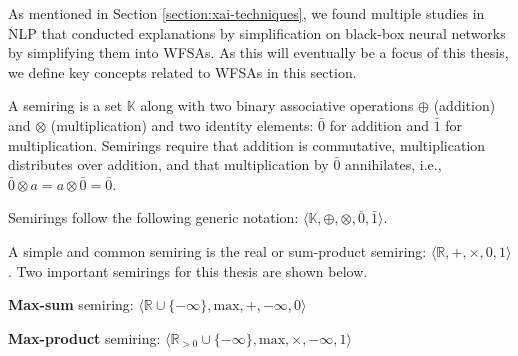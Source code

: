 \label{section:wfsa}

As mentioned in Section \ref{section:xai-techniques}, we found multiple studies in NLP that conducted explanations by simplification on black-box neural networks by simplifying them into WFSAs. As this will eventually be a focus of this thesis, we define key concepts related to WFSAs in this section.

\begin{definition}
  A semiring is a set $\mathbb{K}$ along with two binary associative operations $\oplus$ (addition) and $\otimes$ (multiplication) and two identity elements: $\bar{0}$ for addition and $\bar{1}$ for multiplication. Semirings require that addition is commutative, multiplication distributes over addition, and that multiplication by $\bar{0}$ annihilates, i.e., $\bar{0} \otimes a = a \otimes \bar{0} = \bar{0}$.

\begin{remark}
  Semirings follow the following generic notation: $\langle \mathbb{K}, \oplus, \otimes, \bar{0}, \bar{1} \rangle$.
\end{remark}

\begin{remark}
  A simple and common semiring is the real or sum-product semiring: $\langle \mathbb{R}, +, \times, 0, 1 \rangle$. Two important semirings for this thesis are shown below.
\end{remark}

\begin{remark}
  \textbf{Max-sum} semiring: $\langle \mathbb{R} \cup \{-\infty\}, \text{max}, +, -\infty, 0 \rangle$
\end{remark}

\begin{remark}
  \textbf{Max-product} semiring: $\langle \mathbb{R}_{>0} \cup \{-\infty\}, \text{max}, \times, -\infty, 1 \rangle$
\end{remark}

\end{definition}

